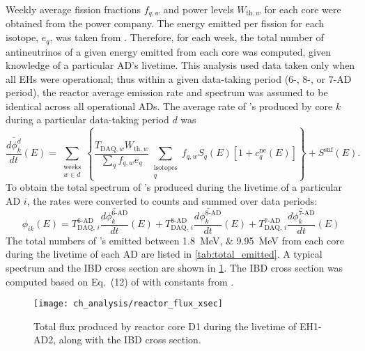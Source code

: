 Weekly average fission fractions $f_{q,w}$ and power levels $W_{\text{th},w}$ for each core
were obtained from the power company.
The energy emitted per fission for each isotope, $e_q$, was taken from
\cite{thermal_fission}.
Therefore, for each week, the total number of antineutrinos
of a given energy emitted from each core was computed,
given knowledge of a particular AD's livetime.
This analysis used data taken only when all EHs were operational;
thus within a given data-taking period (6-, 8-, or 7-AD period),
the reactor \nuebar{} average emission rate and spectrum was assumed to be identical
across all operational ADs.
The average rate of \nuebar{}'s produced by core $k$
during a particular data-taking period $d$ was
\begin{equation}\label{eq:reactor_spectrum_rate}
    \overline{\frac{d\phi_{k}^{d}}{dt}}(E) =
    \sum_{\substack{\text{weeks}\\w\in d}}\left\{
        \frac{T_{\text{DAQ},w} W_{\text{th},w}}{\sum_q f_{q,w} e_q}
        \sum_{\substack{\text{isotopes}\\q}}
    f_{q,w} S_q(E) \left[1+c_q^{\text{ne}}(E)\right]\right\} + S^{\text{snf}}(E).
\end{equation}
To obtain the total spectrum of \nuebar{}'s produced
during the livetime of a particular AD $i$,
the rates were converted to counts and summed over data periods:
\begin{equation}\label{eq:reactor_spectrum}
    \phi_{ik}(E) =
    T_{\text{DAQ},\,i}^{\text{6-AD}}
    \overline{\frac{d\phi_{k}^{\text{6-AD}}}{dt}}(E)
    + T_{\text{DAQ},\,i}^{\text{8-AD}}
    \overline{\frac{d\phi_{k}^{\text{8-AD}}}{dt}}(E)
    + T_{\text{DAQ},\,i}^{\text{7-AD}}
    \overline{\frac{d\phi_{k}^{\text{7-AD}}}{dt}}(E)
\end{equation}
The total numbers of \nuebar{}'s emitted between \SIlist{1.8;9.95}{\MeV}
from each core during the livetime of each AD are listed in \cref{tab:total_emitted}.
A typical \nuebar{} spectrum and the IBD cross section are shown
in \cref{fig:reactor_flux_xsec}.
The IBD cross section was computed \cite{ibd_xsec_note}
based on Eq.~(12) of \cite{ibd_xsec}
with constants from \cite{neutron_beta_theory,pdg2010}.

\begin{figure}
    \centering
    \texttt{[image: ch\_analysis/reactor\_flux\_xsec]}
    \caption[Total reactor \nuebar{} flux and IBD cross section]{
        Total \nuebar{} flux produced by reactor core D1
        during the livetime of EH1-AD2,
        along with the IBD cross section.
    }
    \label{fig:reactor_flux_xsec}
\end{figure}

